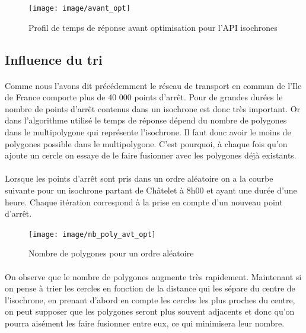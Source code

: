 \documentclass[a4paper]{report}
\begin{document}
\begin{figure}[H]
	\begin{center}
		\texttt{[image: image/avant\_opt]}
		\caption{Profil de temps de réponse avant optimisation pour l'API isochrones}
		\label{Profils de temps de réponse avant optimisation pour l'API isochrones}
	\end{center}
\end{figure}

\subsection{Influence du tri}

\paragraph{}Comme nous l'avons dit précédemment le réseau de transport en commun de l'Ile de France comporte plus de 40 000 points d'arrêt. Pour de grandes durées le nombre de points d'arrêt contenus dans un isochrone est donc très important. Or dans l'algorithme utilisé le temps de réponse dépend du nombre de polygones dans le multipolygone qui représente l'isochrone. Il faut donc avoir le moins de polygones possible dans le multipolygone. C'est pourquoi, à chaque fois qu'on ajoute un cercle on essaye de le faire fusionner avec les polygones déjà existants. 

\paragraph{} Lorsque les points d'arrêt sont pris dans un ordre aléatoire on a la courbe suivante pour un isochrone partant de Châtelet à 8h00 et ayant une durée d'une heure. Chaque itération correspond à la prise en compte d'un nouveau point d'arrêt.

\begin{figure}[H]
	\begin{center}
		\texttt{[image: image/nb\_poly\_avt\_opt]}
		\caption{Nombre de polygones pour un ordre aléatoire}
		\label{Nombre de polygones pour un ordre aléatoire}
	\end{center}
\end{figure}

\paragraph{} On observe que le nombre de polygones augmente très rapidement. Maintenant si on pense à trier les cercles en fonction de la distance qui les sépare du centre de l'isochrone, en prenant d'abord en compte les cercles les plus proches du centre, on peut supposer que les polygones seront plus souvent adjacents et donc qu'on pourra aisément les faire fusionner entre eux, ce qui minimisera leur nombre. 
\end{document}
